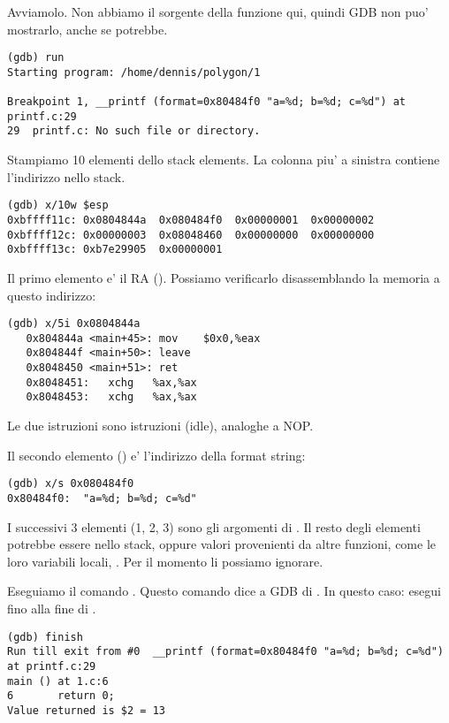 Avviamolo.
Non abbiamo il sorgente della funzione \printf qui, quindi \ac{GDB} non puo' mostrarlo, anche se potrebbe.

\begin{lstlisting}
(gdb) run
Starting program: /home/dennis/polygon/1 

Breakpoint 1, __printf (format=0x80484f0 "a=%d; b=%d; c=%d") at printf.c:29
29	printf.c: No such file or directory.
\end{lstlisting}

Stampiamo 10 elementi dello stack elements. La colonna piu' a sinistra contiene l'indirizzo nello stack.

\begin{lstlisting}
(gdb) x/10w $esp
0xbffff11c:	0x0804844a	0x080484f0	0x00000001	0x00000002
0xbffff12c:	0x00000003	0x08048460	0x00000000	0x00000000
0xbffff13c:	0xb7e29905	0x00000001
\end{lstlisting}

Il primo elemento e' il \ac{RA} ().
Possiamo verificarlo disassemblando la memoria a questo indirizzo:

\begin{lstlisting}[label=NOP_as_XCHG_example]
(gdb) x/5i 0x0804844a
   0x804844a <main+45>:	mov    $0x0,%eax
   0x804844f <main+50>:	leave  
   0x8048450 <main+51>:	ret    
   0x8048451:	xchg   %ax,%ax
   0x8048453:	xchg   %ax,%ax
\end{lstlisting}

Le due istruzioni  sono istruzioni  (idle), analoghe a \ac{NOP}.

Il secondo elemento () e' l'indirizzo della format string:

\begin{lstlisting}
(gdb) x/s 0x080484f0
0x80484f0:	"a=%d; b=%d; c=%d"
\end{lstlisting}

I successivi 3 elementi (1, 2, 3) sono gli argomenti di \printf.
Il resto degli elementi potrebbe essere  nello stack, oppure valori provenienti da altre funzioni, come le loro variabili locali,  \etc{}.
Per il momento li possiamo ignorare.

Eseguiamo il comando . 
Questo comando dice a GDB di .
In questo caso: esegui fino alla fine di \printf.

\begin{lstlisting}
(gdb) finish
Run till exit from #0  __printf (format=0x80484f0 "a=%d; b=%d; c=%d") at printf.c:29
main () at 1.c:6
6		return 0;
Value returned is $2 = 13
\end{lstlisting}

